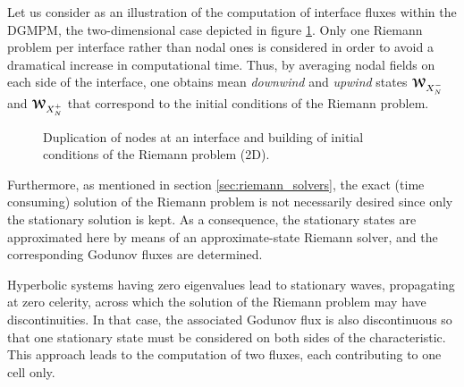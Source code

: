 Let us consider as an illustration of the computation of interface fluxes within the DGMPM, the two-dimensional case depicted in figure \ref{fig:2D_edge}.
Only one Riemann problem per interface rather than nodal ones is considered in order to avoid a dramatical increase in computational time.
Thus, by averaging nodal fields on each side of the interface, one obtains mean \textit{downwind} and \textit{upwind} states ${\boldsymbol{\mathcal{W}}}_{X_N^-}$ and ${\boldsymbol{\mathcal{W}}}_{X_N^+}$ that correspond to the initial conditions of the Riemann problem.
\begin{figure}[h!]
  \centering
  
  \caption{Duplication of nodes at an interface and building of initial conditions of the Riemann problem (2D).}
  \label{fig:2D_edge}
\end{figure}
Furthermore, as mentioned in section \ref{sec:riemann_solvers}, the exact (time consuming) solution of the Riemann problem is not necessarily desired since only the stationary solution is kept. As a consequence, the stationary states are approximated here by means of an approximate-state Riemann solver, and the corresponding Godunov fluxes are determined.
\begin{remark}
  Hyperbolic systems having zero eigenvalues lead to stationary waves, propagating at zero celerity, across which the solution of the Riemann problem may have discontinuities. In that case, the associated Godunov flux is also discontinuous so that one stationary state must be considered on both sides of the characteristic. This approach leads to the computation of two fluxes, each contributing to one cell only. 
\end{remark}

